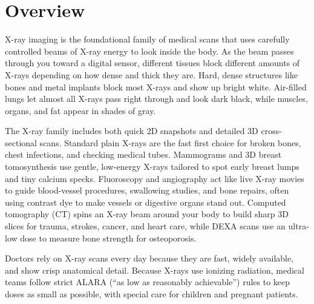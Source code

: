 \label{ch:infographic-xray-imaging-overview}

\section{Overview}

X-ray imaging is the foundational family of medical scans that uses carefully controlled beams of X-ray energy to look inside the body. As the beam passes through you toward a digital sensor, different tissues block different amounts of X-rays depending on how dense and thick they are. Hard, dense structures like bones and metal implants block most X-rays and show up bright white. Air-filled lungs let almost all X-rays pass right through and look dark black, while muscles, organs, and fat appear in shades of gray.

The X-ray family includes both quick 2D snapshots and detailed 3D cross-sectional scans. Standard plain X-rays are the fast first choice for broken bones, chest infections, and checking medical tubes. Mammograms and 3D breast tomosynthesis use gentle, low-energy X-rays tailored to spot early breast lumps and tiny calcium specks. Fluoroscopy and angiography act like live X-ray movies to guide blood-vessel procedures, swallowing studies, and bone repairs, often using contrast dye to make vessels or digestive organs stand out. Computed tomography (CT) spins an X-ray beam around your body to build sharp 3D slices for trauma, strokes, cancer, and heart care, while DEXA scans use an ultra-low dose to measure bone strength for osteoporosis.

Doctors rely on X-ray scans every day because they are fast, widely available, and show crisp anatomical detail. Because X-rays use ionizing radiation, medical teams follow strict ALARA (``as low as reasonably achievable'') rules to keep doses as small as possible, with special care for children and pregnant patients.

